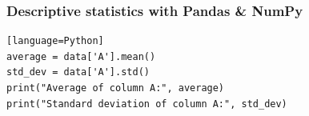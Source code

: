 \documentclass{beamer}
\begin{document}
    \begin{frame}[fragile]
    \frametitle{Descriptive statistics with Pandas \& NumPy}
    \begin{lstlisting}[caption=Calculating the average and standard deviation of a column using Pandas][language=Python]
average = data['A'].mean()
std_dev = data['A'].std()
print("Average of column A:", average)
print("Standard deviation of column A:", std_dev)
    \end{lstlisting}
    \end{frame}







\end{document}
